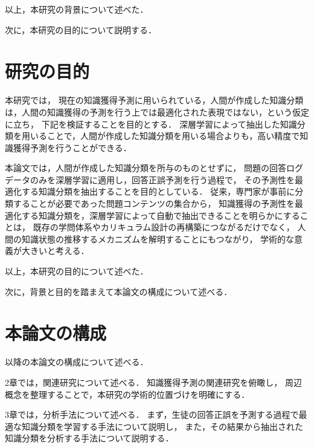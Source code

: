 \vvspace
以上，本研究の背景について述べた．

次に，本研究の目的について説明する．


\section{研究の目的}
本研究では，
現在の知識獲得予測に用いられている，人間が作成した知識分類は，人間の知識獲得の予測を行う上では最適化された表現ではない，という仮定に立ち，
下記を検証することを目的とする．
\vvspace
深層学習によって抽出した知識分類を用いることで，人間が作成した知識分類を用いる場合よりも，高い精度で知識獲得予測を行うことができる．
\vvspace

本論文では，人間が作成した知識分類を所与のものとせずに，
問題の回答ログデータのみを深層学習に適用し，回答正誤予測を行う過程で，
その予測性を最適化する知識分類を抽出することを目的としている．
従来，専門家が事前に分類することが必要であった問題コンテンツの集合から，
知識獲得の予測性を最適化する知識分類を，深層学習によって自動で抽出できることを明らかにすることは，
既存の学問体系やカリキュラム設計の再構築につながるだけでなく，
人間の知識状態の推移するメカニズムを解明することにもつながり，
学術的な意義が大きいと考える．


\vvspace
以上，本研究の目的について述べた．

次に，背景と目的を踏まえて本論文の構成について述べる．



\section{本論文の構成}
以降の本論文の構成について述べる．

\vvspace

2章では，関連研究について述べる．
知識獲得予測の関連研究を俯瞰し，
周辺概念を整理することで，本研究の学術的位置づけを明確にする．

\vvspace

3章では，分析手法について述べる．
まず，生徒の回答正誤を予測する過程で最適な知識分類を学習する手法について説明し，
また，その結果から抽出された知識分類を分析する手法について説明する．

\vvspace


